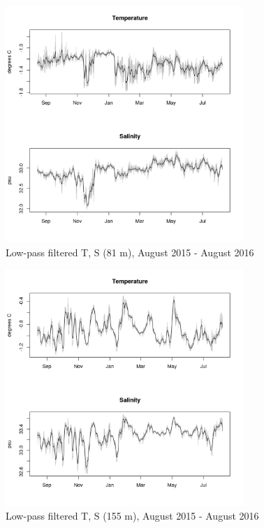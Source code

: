 \documentclass[12pt]{dforeport}
\begin{document}
\begin{figure}  
\centering
\includegraphics[width = 0.8\textwidth]{./figures/34_lpf_TS_81m_2015_2016.png}
\caption[Low-pass filtered T, S (81 m), 2015-2016]{Low-pass filtered T, S (81 m), August 2015 - August 2016}
\label{f:ctd_81_lpf_2015_2016}
\end{figure}

\begin{figure}  
\centering
\includegraphics[width = 0.8\textwidth]{./figures/35_lpf_TS_155m_2015_2016.png}
\caption[Low-pass filtered T, S (155 m), 2015-2016]{Low-pass filtered T, S (155 m), August 2015 - August 2016}
\label{f:ctd_155_lpf_2015_2016}
\end{figure}
\end{document}
